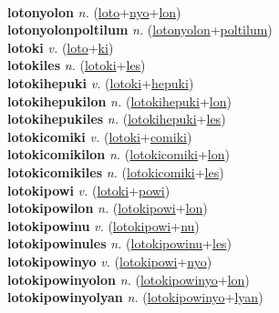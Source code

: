  \label{lotonules} \\
\textbf{lotonyolon} \textit{n.} (\hyperref[loto]{loto}+\hyperref[nyo]{nyo}+\hyperref[lon]{lon})
 \label{lotonyolon} \\
\textbf{lotonyolonpoltilum} \textit{n.} (\hyperref[lotonyolon]{lotonyolon}+\hyperref[poltilum]{poltilum})
 \label{lotonyolonpoltilum} \\
\textbf{lotoki} \textit{v.} (\hyperref[loto]{loto}+\hyperref[ki]{ki})
 \label{lotoki} \\
\textbf{lotokiles} \textit{n.} (\hyperref[lotoki]{lotoki}+\hyperref[les]{les})
 \label{lotokiles} \\
\textbf{lotokihepuki} \textit{v.} (\hyperref[lotoki]{lotoki}+\hyperref[hepuki]{hepuki})
 \label{lotokihepuki} \\
\textbf{lotokihepukilon} \textit{n.} (\hyperref[lotokihepuki]{lotokihepuki}+\hyperref[lon]{lon})
 \label{lotokihepukilon} \\
\textbf{lotokihepukiles} \textit{n.} (\hyperref[lotokihepuki]{lotokihepuki}+\hyperref[les]{les})
 \label{lotokihepukiles} \\
\textbf{lotokicomiki} \textit{v.} (\hyperref[lotoki]{lotoki}+\hyperref[comiki]{comiki})
 \label{lotokicomiki} \\
\textbf{lotokicomikilon} \textit{n.} (\hyperref[lotokicomiki]{lotokicomiki}+\hyperref[lon]{lon})
 \label{lotokicomikilon} \\
\textbf{lotokicomikiles} \textit{n.} (\hyperref[lotokicomiki]{lotokicomiki}+\hyperref[les]{les})
 \label{lotokicomikiles} \\
\textbf{lotokipowi} \textit{v.} (\hyperref[lotoki]{lotoki}+\hyperref[powi]{powi})
 \label{lotokipowi} \\
\textbf{lotokipowilon} \textit{n.} (\hyperref[lotokipowi]{lotokipowi}+\hyperref[lon]{lon})
 \label{lotokipowilon} \\
\textbf{lotokipowinu} \textit{v.} (\hyperref[lotokipowi]{lotokipowi}+\hyperref[nu]{nu})
 \label{lotokipowinu} \\
\textbf{lotokipowinules} \textit{n.} (\hyperref[lotokipowinu]{lotokipowinu}+\hyperref[les]{les})
 \label{lotokipowinules} \\
\textbf{lotokipowinyo} \textit{v.} (\hyperref[lotokipowi]{lotokipowi}+\hyperref[nyo]{nyo})
 \label{lotokipowinyo} \\
\textbf{lotokipowinyolon} \textit{n.} (\hyperref[lotokipowinyo]{lotokipowinyo}+\hyperref[lon]{lon})
 \label{lotokipowinyolon} \\
\textbf{lotokipowinyolyan} \textit{n.} (\hyperref[lotokipowinyo]{lotokipowinyo}+\hyperref[lyan]{lyan})
